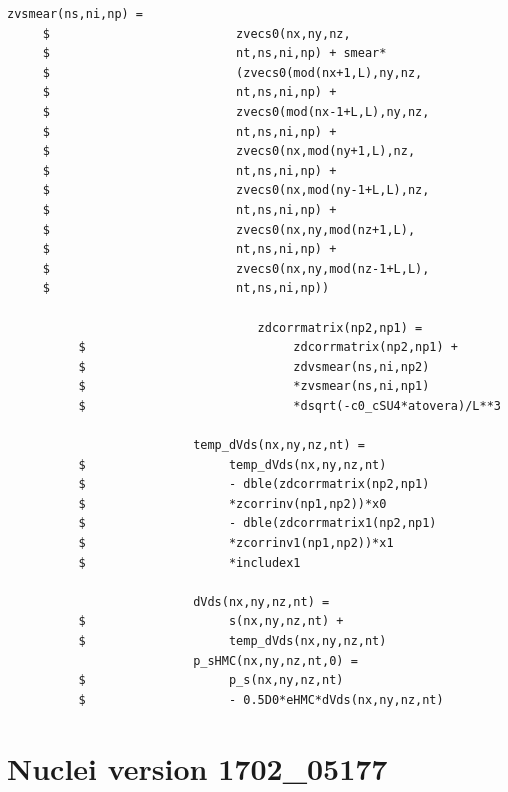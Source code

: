 \documentclass[10pt]{book}
\begin{document}
\begin{lstlisting}[frame=single]
                           zvsmear(ns,ni,np) =
     $                          zvecs0(nx,ny,nz,
     $                          nt,ns,ni,np) + smear*
     $                          (zvecs0(mod(nx+1,L),ny,nz,
     $                          nt,ns,ni,np) +
     $                          zvecs0(mod(nx-1+L,L),ny,nz,
     $                          nt,ns,ni,np) +
     $                          zvecs0(nx,mod(ny+1,L),nz,
     $                          nt,ns,ni,np) +
     $                          zvecs0(nx,mod(ny-1+L,L),nz,
     $                          nt,ns,ni,np) +
     $                          zvecs0(nx,ny,mod(nz+1,L),
     $                          nt,ns,ni,np) +
     $                          zvecs0(nx,ny,mod(nz-1+L,L),
     $                          nt,ns,ni,np))
     
                                   zdcorrmatrix(np2,np1) =
          $                             zdcorrmatrix(np2,np1) +
          $                             zdvsmear(ns,ni,np2)
          $                             *zvsmear(ns,ni,np1)
          $                             *dsqrt(-c0_cSU4*atovera)/L**3
     
                          temp_dVds(nx,ny,nz,nt) =
          $                    temp_dVds(nx,ny,nz,nt)
          $                    - dble(zdcorrmatrix(np2,np1)
          $                    *zcorrinv(np1,np2))*x0
          $                    - dble(zdcorrmatrix1(np2,np1)
          $                    *zcorrinv1(np1,np2))*x1
          $                    *includex1
     
                          dVds(nx,ny,nz,nt) =
          $                    s(nx,ny,nz,nt) +
          $                    temp_dVds(nx,ny,nz,nt)
                          p_sHMC(nx,ny,nz,nt,0) =
          $                    p_s(nx,ny,nz,nt)
          $                    - 0.5D0*eHMC*dVds(nx,ny,nz,nt) 

\end{lstlisting}

\newpage 

\chapter{Nuclei version 1702\_05177} 
\end{document}
